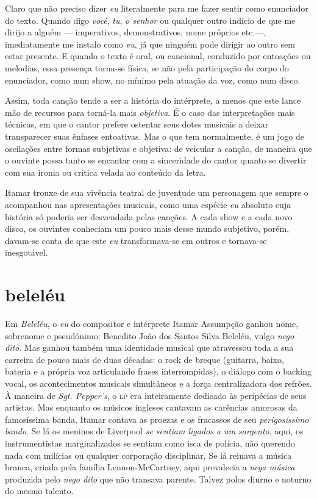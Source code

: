 Claro que não preciso dizer \textit{eu} literalmente para me fazer sentir
como enunciador do texto. Quando digo \textit{você}, \textit{tu}, \textit{o senhor} ou
qualquer outro indício de que me dirijo a alguém --- imperativos,
demonstrativos, nome próprios etc.---, imediatamente me instalo como
\textit{eu}, já que ninguém pode dirigir ao outro sem estar presente. E
quando o texto é oral, ou cancional, conduzido por entoações ou
melodias, essa presença torna-se física, se não pela participação do
corpo do enunciador, como num show, no mínimo pela atuação da voz, como
num disco.

Assim, toda canção tende a ser a história do intérprete, a menos que
este lance mão de recursos para torná-la mais \textit{objetiva}. É o caso das
interpretações mais técnicas, em que o cantor prefere ostentar seus
dotes musicais a deixar transparecer suas ênfases entoativas. Mas o que
tem normalmente, é um jogo de oscilações entre formas subjetivas e
objetiva: de veicular a canção, de maneira que o ouvinte possa tanto se
encantar com a sinceridade do cantor quanto se divertir com sua ironia
ou crítica velada ao conteúdo da letra.

Itamar trouxe de sua vivência teatral de juventude um personagem que
sempre o acompanhou nas apresentações musicais, como uma espécie \textit{eu}
absoluto cuja história só poderia ser desvendada pelas canções. A cada
show e a cada novo disco, os ouvintes conheciam um pouco mais desse
mundo subjetivo, porém, davam-se conta de que este \textit{eu}
transformava-se em outros e tornava-se inesgotável.

\section{beleléu}

Em \textit{Beleléu}, o \textit{eu} do compositor e intérprete Itamar Assumpção ganhou
nome, sobrenome e pseudônimo: Benedito João dos Santos Silva Beleléu,
vulgo \textit{nego dito}. Mas ganhou também uma identidade musical que atravessou
toda a sua carreira de pouco mais de duas décadas: o rock de breque
(guitarra, baixo, bateria e a própria voz articulando frases
interrompidas), o diálogo com o backing vocal, os acontecimentos
musicais simultâneos e a força centralizadora dos refrões. À maneira de
\textit{Sgt. Pepper's}, o \textsc{lp} era inteiramente dedicado às peripécias de seus
artistas. Mas enquanto os músicos ingleses cantavam as carências
amorosas da famosíssima banda, Itamar contava as proezas e os fracassos
de seu \textit{perigosíssimo bando}. Se lá os meninos de Liverpool \textit{se
sentiam ligados a um sargento}, aqui, os instrumentistas marginalizados
se sentiam como isca de polícia, não querendo nada com milícias ou
qualquer corporação disciplinar. Se lá reinava a música branca, criada
pela família Lennon-McCartney, aqui prevalecia a \textit{nega música}
produzida pelo \textit{nego dito} que não transava parente. Talvez polos
diurno e noturno do mesmo talento.

